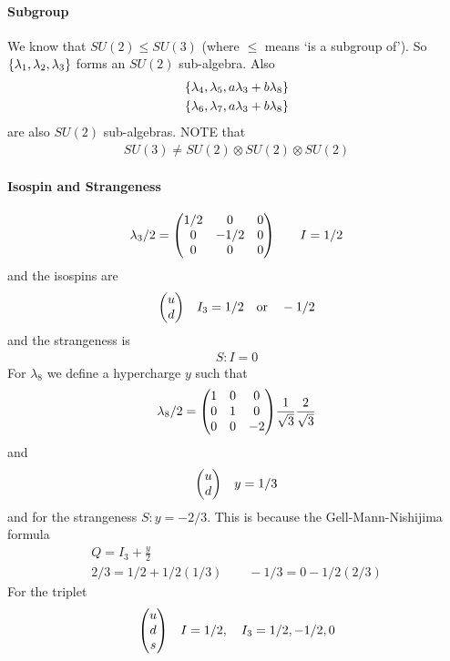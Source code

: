 \documentclass[../main.tex]{subfiles}
\begin{document}
\paragraph*{Subgroup} We know that $SU(2) \leq SU(3)$ (where $\leq$ means `is a subgroup of'). So
$\qt{\lambda_1, \lambda_2, \lambda_3}$ forms an $SU(2)$ sub-algebra. Also
\begin{align*}
    \qt{\lambda_4, \lambda_5, a \lambda_3 + b \lambda_8} \\
    \qt{\lambda_6, \lambda_7, a \lambda_3 + b \lambda_8}
\end{align*}
are also $SU(2)$ sub-algebras. NOTE that
\begin{align*}
    SU(3) \neq SU(2) \otimes SU(2) \otimes SU(2)
\end{align*}
\paragraph*{Isospin and Strangeness}
\begin{align*}
    \lambda_3/2 = \mqty(1/2 & 0 & 0 \\ 0 & -1/2 & 0 \\ 0 & 0 & 0) \qquad I = 1/2
\end{align*}
and the isospins are
\begin{align*}
    \mqty(u \\ d) \quad I_3 = 1/2 \qor -1/2
\end{align*}
and the strangeness is
\begin{align*}
    S: I = 0
\end{align*}
For $\lambda_8$ we define a hypercharge $y$ such that
\begin{align*}
    \lambda_8 /2 = \mqty(1 & 0 & 0 \\ 0 & 1 & 0 \\ 0 & 0 & -2) \frac{1}{\sqrt{3}} \frac{2}{\sqrt{3}}
\end{align*}
and
\begin{align*}
    \mqty(u \\ d) \quad y = 1/3
\end{align*}
and for the strangeness $S: y = -2/3$. This is because the Gell-Mann-Nishijima formula
\begin{align*}
    Q = I_3 + \frac{y}{2} \\
    2/3 = 1/2 + 1/2 (1/3) \qquad -1/3 = 0 - 1/2 (2/3)
\end{align*}
For the triplet
\begin{align*}
    \mqty(u \\ d \\ s) \quad I = 1/2, \quad I_3 = 1/2, -1/2, 0
\end{align*}
\end{document}
